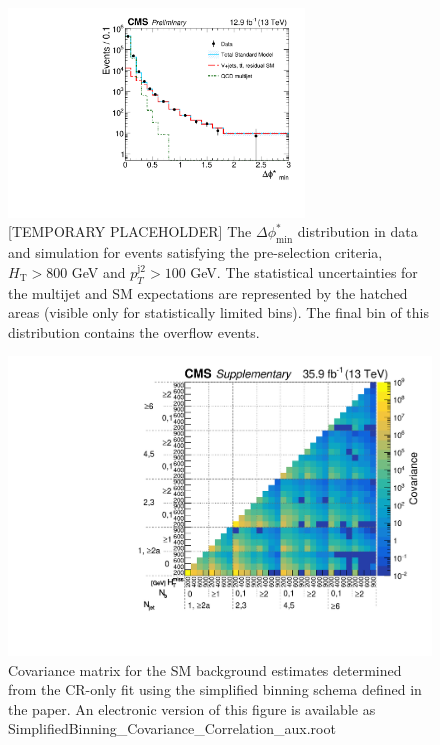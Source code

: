 \begin{figure}[p]
    \caption{ 
	[TEMPORARY PLACEHOLDER]
    The $\Delta\phi^{*}_{\mathrm{min}}$ distribution in data and simulation for events
	satisfying the pre-selection criteria, $H_{\mathrm{T}} > 800$ GeV and
	$p_{T}^{\mathrm{j2}} > 100$ GeV. 
	The statistical uncertainties for the multijet and SM expectations are represented by the hatched areas (visible only for statistically limited bins).
	 The final bin of this distribution contains the overflow events.
    \label{fig:bDPhi} }
  \begin{center}
  \includegraphics[width=0.7\textwidth]{Supplementary/bDPhi_aux}
  \end{center}
\end{figure}


\clearpage
\begin{figure}
  \centering
  \includegraphics[width=\textwidth]{Supplementary/SimplifiedBinning_Covariance_aux}
  \caption{Covariance matrix for the SM background estimates
    determined from the CR-only fit using the simplified binning
	schema defined in the paper.
	An electronic version of this figure is available as SimplifiedBinning\_Covariance\_Correlation\_aux.root
	} %
  \label{fig:covariance_aux}
\end{figure} 
\clearpage

